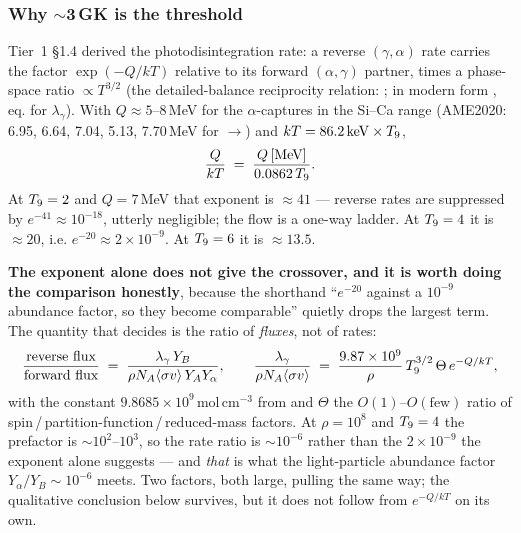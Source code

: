 \subsubsection{Why $\sim$3\,GK is the threshold}
\label{sec:threegk}

Tier~1 \S1.4 derived the photodisintegration rate: a reverse $(\gamma, \alpha)$
rate carries the factor $\exp(-Q/kT)$ relative to its forward
$(\alpha, \gamma)$ partner, times a phase-space ratio $\propto T^{3/2}$ (the
detailed-balance reciprocity relation: \citealp{fcz1967}; in modern form
\citealp{rauscher2000}, eq. for $\lambda_\gamma$). With $Q \approx 5$--8\,MeV
for the $\alpha$-captures in the Si--Ca range (AME2020: 6.95, 6.64, 7.04, 5.13,
7.70\,MeV for $\to$) and $kT = 86.2\,\mathrm{keV}
\times T_{9}$,
%
\begin{equation}
\frac{Q}{kT} \;=\; \frac{Q\,[\mathrm{MeV}]}{0.0862\,T_{9}}.
\label{eq:qkt}
\end{equation}
%
At $T_{9} = 2$ and $Q = 7$\,MeV that exponent is $\approx 41$ --- reverse rates
are suppressed by $e^{-41} \approx 10^{-18}$, utterly negligible; the flow is a
one-way ladder. At $T_{9} = 4$ it is $\approx 20$, i.e.
$e^{-20} \approx 2\times10^{-9}$. At $T_{9} = 6$ it is $\approx 13.5$.

\textbf{The exponent alone does not give the crossover, and it is worth doing
the comparison honestly}, because the shorthand ``$e^{-20}$ against a $10^{-9}$
abundance factor, so they become comparable'' quietly drops the largest term.
The quantity that decides is the ratio of \emph{fluxes}, not of rates:
%
\begin{equation}
\frac{\text{reverse flux}}{\text{forward flux}}
\;=\; \frac{\lambda_\gamma\,Y_B}
           {\rho N_A\langle\sigma v\rangle\,Y_A Y_\alpha},
\qquad
\frac{\lambda_\gamma}{\rho N_A\langle\sigma v\rangle}
\;=\; \frac{9.87\times10^{9}}{\rho}\,T_{9}^{3/2}\,\Theta\,e^{-Q/kT},
\label{eq:fluxratio}
\end{equation}
%
with the constant $9.8685\times10^{9}$\,mol\,cm$^{-3}$ from
\citet{rauscher2000} and $\Theta$ the $O(1)$--$O(\text{few})$ ratio of
spin\,/\,partition-function\,/\,reduced-mass factors. At $\rho = 10^{8}$ and
$T_{9} = 4$ the prefactor is ${\sim}10^{2}$--$10^{3}$, so the rate ratio is
${\sim}10^{-6}$ rather than the $2\times10^{-9}$ the exponent alone suggests
--- and \emph{that} is what the light-particle abundance factor
$Y_\alpha/Y_B \sim 10^{-6}$ meets. Two factors, both large, pulling the same
way; the qualitative conclusion below survives, but it does not follow from
$e^{-Q/kT}$ on its own.\derivedhere

